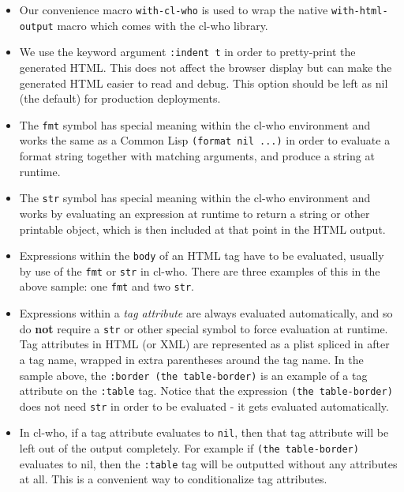 \documentclass [11pt]{book}
\begin{document}
\begin{itemize}

\item Our convenience macro \texttt{with-cl-who} is used to wrap the native \texttt{with-html-output} macro which comes with the cl-who library.

\item We use the keyword argument \texttt{:indent t} in order to pretty-print the generated HTML. This does
     not affect the browser display but can make the generated HTML
     easier to read and debug. This option should be left as nil (the
     default) for production deployments.

\item The \texttt{fmt} symbol has special meaning
      within the cl-who environment and works the same as a Common
      Lisp \texttt{(format nil ...)} in order to evaluate a format
      string together with matching arguments, and produce a string at
      runtime.

\item The \texttt{str} symbol has special meaning
      within the cl-who environment and works by evaluating an
      expression at runtime to return a string or other printable
      object, which is then included at that point in the HTML output.

\item Expressions within the \texttt{body} of an
      HTML tag have to be evaluated, usually by use of the \texttt{fmt} or \texttt{str} in cl-who.  There are three examples of this in the
      above sample: one \texttt{fmt} and two \texttt{str}.

\item Expressions within a \emph{tag attribute} are always evaluated automatically, and so do 
\textbf{not} require a \texttt{str} or other special symbol to force evaluation at
      runtime. Tag attributes in HTML (or XML) are represented as a
      plist spliced in after a tag name, wrapped in extra parentheses
      around the tag name. In the sample above, the \texttt{:border (the table-border)} is an example of a tag attribute on the \texttt{:table} tag. Notice that the expression \texttt{(the table-border)} does not need \texttt{str} in order to be evaluated - it gets evaluated automatically.

\item In cl-who, if a tag attribute evaluates to \texttt{nil}, then that tag attribute will be left out of the output
      completely. For example if \texttt{(the table-border)} evaluates to nil, then the \texttt{:table} tag will be outputted without any attributes at
      all. This is a convenient way to conditionalize tag
      attributes.


\end{itemize}
\end{document}
